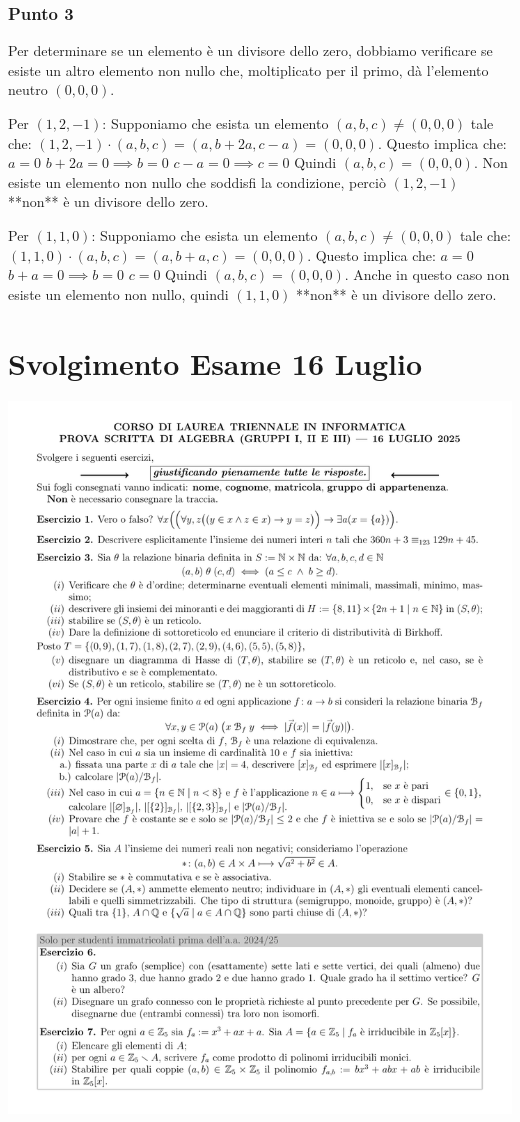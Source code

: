 \subsubsection*{Punto 3}
Per determinare se un elemento è un divisore dello zero, dobbiamo verificare se esiste un altro elemento non nullo che, moltiplicato per il primo, dà l'elemento neutro $(0,0,0)$.

Per $(1, 2, -1)$:
Supponiamo che esista un elemento $(a, b, c) \ne (0, 0, 0)$ tale che:
$(1, 2, -1) \cdot (a, b, c) = (a, b+2a, c-a) = (0, 0, 0)$.
Questo implica che:
$a = 0$
$b + 2a = 0 \implies b=0$
$c - a = 0 \implies c=0$
Quindi $(a, b, c) = (0, 0, 0)$. Non esiste un elemento non nullo che soddisfi la condizione, perciò $(1, 2, -1)$ **non** è un divisore dello zero.

Per $(1, 1, 0)$:
Supponiamo che esista un elemento $(a, b, c) \ne (0, 0, 0)$ tale che:
$(1, 1, 0) \cdot (a, b, c) = (a, b+a, c) = (0, 0, 0)$.
Questo implica che:
$a = 0$
$b + a = 0 \implies b=0$
$c = 0$
Quindi $(a, b, c) = (0, 0, 0)$. Anche in questo caso non esiste un elemento non nullo, quindi $(1, 1, 0)$ **non** è un divisore dello zero.

\section{Svolgimento Esame 16 Luglio}
\begin{center}
	\includegraphics[scale=.85]{pdf/25-07-16.pdf}
\end{center}

